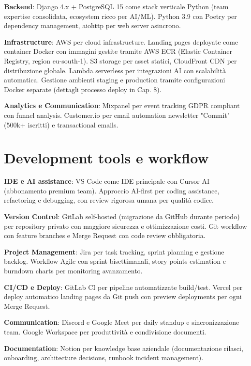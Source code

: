 \textbf{Backend}: Django 4.x + PostgreSQL 15 come stack verticale Python (team expertise consolidata, ecosystem ricco per AI/ML). Python 3.9 con Poetry per dependency management, aiohttp per web server asincrono.

\textbf{Infrastructure}: AWS per cloud infrastructure. Landing pages deployate come container Docker con immagini gestite tramite AWS ECR (Elastic Container Registry, region eu-south-1). S3 storage per asset statici, CloudFront CDN per distribuzione globale. Lambda serverless per integrazioni AI con scalabilità automatica. Gestione ambienti staging e production tramite configurazioni Docker separate (dettagli processo deploy in Cap. 8).

\textbf{Analytics e Communication}: Mixpanel per event tracking GDPR compliant con funnel analysis. Customer.io per email automation newsletter "Commit" (500k+ iscritti) e transactional emails.

\section{Development tools e workflow}

\textbf{IDE e AI assistance}: VS Code come IDE principale con Cursor AI (abbonamento premium team). Approccio AI-first per coding assistance, refactoring e debugging, con review rigorosa umana per qualità codice.

\textbf{Version Control}: GitLab self-hosted (migrazione da GitHub durante periodo) per repository privato con maggiore sicurezza e ottimizzazione costi. Git workflow con feature branches e Merge Request con code review obbligatoria.

\textbf{Project Management}: Jira per task tracking, sprint planning e gestione backlog. Workflow Agile con sprint bisettimanali, story points estimation e burndown charts per monitoring avanzamento.

\textbf{CI/CD e Deploy}: GitLab CI per pipeline automatizzate build/test. Vercel per deploy automatico landing pages da Git push con preview deployments per ogni Merge Request.

\textbf{Communication}: Discord e Google Meet per daily standup e sincronizzazione team. Google Workspace per produttività e condivisione documenti.

\textbf{Documentation}: Notion per knowledge base aziendale (documentazione rilasci, onboarding, architecture decisions, runbook incident management).